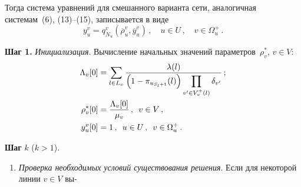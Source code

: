 \begin{multicols}{2}
     Тогда система уравнений для смешанного варианта сети, аналогичная 
системам~(6), (13)--(15), записывается в виде
     $$
     y_u^v = q_{N_u}^v(\overline{\rho}_u^v,\overline{y}_u^v)\,,\quad u\in 
U\,,\quad v\in\Omega_u^+\,.
     $$

\smallskip
\textbf{Шаг 1.} \textit{Инициализация}. Вычисление начальных значений 
параметров~$\rho_v^*$, $v\in V$: 
\begin{align*}
\Lambda_v[0]&=\sum\limits_{l\in L_v} 
\displaystyle\frac{\displaystyle \lambda(l)\mathstrut}{\displaystyle \left(1-\pi_{u_{S_l+1}}(l)\right)\prod\limits_{v^\prime\in 
V^+_v(l)}\delta_{v^\prime}\mathstrut}\,; \\
\rho_v^*[0]&=\displaystyle\frac{\displaystyle \Lambda_v[0]\mathstrut}{\displaystyle \mu_v\mathstrut}\,,\enskip v\in V\,, \\
y_u^v[0]&=1\,,\enskip u\in U\,,\enskip v\in\Omega_u^+\,.
\end{align*}
     

\smallskip
\textbf{Шаг} $k$ ($k>1$).
     \begin{enumerate}[1.]
\item \textit{Проверка необходимых условий существования решения}. 
Если для некоторой линии $v\in V$ вы-\linebreak\vspace*{-12pt}
\columnbreak


\end{enumerate}
\end{multicols}
